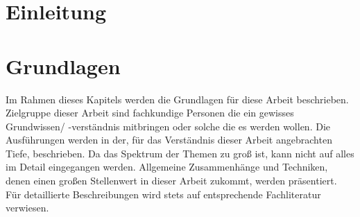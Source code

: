 \documentclass[a4paper,12pt, twoside, openright]{scrbook}
\begin{document}
\frontmatter 






%


\tableofcontents 
%
\listoffigures
%
\listoftables
%
\lstlistoflistings
%

%


\mainmatter 




\renewcommand{\chaptermark}[1]{\markboth{\scshape{\thechapter.\ #1}}{ }}
\renewcommand{\sectionmark}[1]{ \markright{\scshape{\thesection.\  #1}}{} }

\chapter{Einleitung}
%

%
\chapter{Grundlagen}
Im Rahmen dieses Kapitels werden die Grundlagen für diese Arbeit beschrieben. 
Zielgruppe dieser Arbeit sind fachkundige Personen die ein gewisses Grundwissen/ -verständnis mitbringen oder solche die es werden wollen. Die Ausführungen werden in der, für das Verständnis dieser Arbeit angebrachten Tiefe, beschrieben. Da das Spektrum der Themen zu groß ist, kann nicht auf alles im Detail eingegangen werden. Allgemeine Zusammenhänge und Techniken, denen einen großen Stellenwert in dieser Arbeit zukommt, werden  präsentiert. Für detaillierte Beschreibungen wird stets auf entsprechende Fachliteratur verwiesen.\\
%
\end{document}
